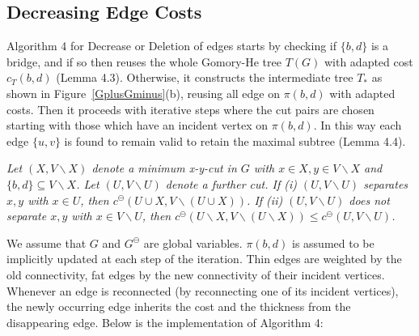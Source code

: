     \vspace{1cm}
    
    \subsection{Decreasing Edge Costs}
    Algorithm 4 for Decrease or Deletion of edges starts by checking if $\{b,d\}$ is a bridge, and if so then reuses the whole Gomory-He tree $T(G)$ with adapted cost $c_T(b,d)$ (Lemma 4.3). Otherwise, it constructs the intermediate tree $T_*$ as shown in Figure~\ref{GplusGminus}(b), reusing all edge on $\pi (b,d)$ with adapted costs. Then it proceeds with iterative steps where the cut pairs are chosen starting with those which have an incident vertex on $\pi (b,d)$. In this way each edge $\{u,v\}$ is found to remain valid to retain the maximal subtree (Lemma 4.4).

    \vspace{5mm}
     \textit{Let $(X,V\backslash X)$ denote a minimum x-y-cut in $G$ with $x\in X, y\in V\backslash X$ and $\{b,d\}\subseteq V\backslash X$. Let $(U,V\backslash U)$ denote a further cut. If (i) $(U,V\backslash U)$ separates $x,y$ with $x\in U$, then $c^\ominus(U\cup X,V\backslash (U\cup X))$. If (ii) $(U,V\backslash U)$ does not separate $x,y$ with $x\in V\backslash U$, then $c^\ominus(U\backslash X,V\backslash(U\backslash X)) \le c^\ominus(U,V\backslash U)$.}
    \vspace{5mm}
    
    \noindent We assume that $G$ and $G^\ominus$ are global variables. $\pi (b,d)$ is assumed to be implicitly updated at each step of the iteration. Thin edges are weighted by the old connectivity, fat edges by the new connectivity of their incident vertices. Whenever an edge is reconnected (by reconnecting one of its incident vertices), the newly occurring edge inherits the cost and the thickness from the disappearing edge. Below is the implementation of Algorithm 4:
    
